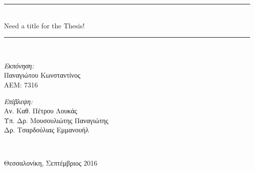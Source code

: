 \begin{titlepage}
\begin{center}
    \rule{450pt}{4pt} \\[0.4cm]
    {\fontsize{20.26pt}{1em}\selectfont Need a title for the Thesis!}

    \rule{350pt}{4pt} \\[4cm]

    \begin{minipage}{0.4\textwidth}
      \begin{flushleft} \large
        \emph{Εκπόνηση:} \\
        Παναγιώτου Κωνσταντίνος \\
        ΑΕΜ: 7316
      \end{flushleft}
    \end{minipage}
    \begin{minipage}{0.4\textwidth}
      \begin{flushright} \large
        \emph{Επίβλεψη:} \\
        Αν. Καθ. Πέτρου Λουκάς\\
        Υπ. Δρ. Μουσουλιώτης Παναγιώτης \\
        Δρ. Τσαρδούλιας Εμμανουήλ
      \end{flushright}
    \end{minipage}
    \\[1cm]
    \vfill

    \large Θεσσαλονίκη, Σεπτέμβριος 2016

  \end{center}
\end{titlepage}
